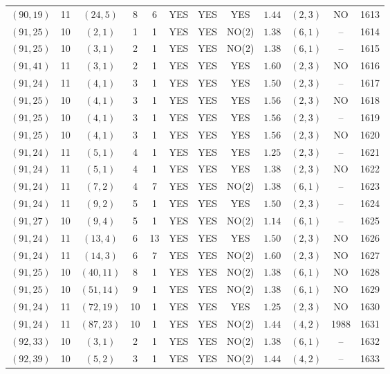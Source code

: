 \begin{longtable}{|c|c|c|c|c|c|c|c|c|c|c|c|}
$(90,19)$ & 11 & $(24,5)$ & 8 & 6 & YES & YES & YES & $1.44$ & $(2,3)$ & NO & 1613\\
$(91,25)$ & 10 & $(2,1)$ & 1 & 1 & YES & YES & NO(2) & $1.38$ & $(6,1)$ & -- & 1614\\
$(91,25)$ & 10 & $(3,1)$ & 2 & 1 & YES & YES & NO(2) & $1.38$ & $(6,1)$ & -- & 1615\\
$(91,41)$ & 11 & $(3,1)$ & 2 & 1 & YES & YES & YES & $1.60$ & $(2,3)$ & NO & 1616\\
$(91,24)$ & 11 & $(4,1)$ & 3 & 1 & YES & YES & YES & $1.50$ & $(2,3)$ & -- & 1617\\
$(91,25)$ & 10 & $(4,1)$ & 3 & 1 & YES & YES & YES & $1.56$ & $(2,3)$ & NO & 1618\\
$(91,25)$ & 10 & $(4,1)$ & 3 & 1 & YES & YES & YES & $1.56$ & $(2,3)$ & -- & 1619\\
$(91,25)$ & 10 & $(4,1)$ & 3 & 1 & YES & YES & YES & $1.56$ & $(2,3)$ & NO & 1620\\
$(91,24)$ & 11 & $(5,1)$ & 4 & 1 & YES & YES & YES & $1.25$ & $(2,3)$ & -- & 1621\\
$(91,24)$ & 11 & $(5,1)$ & 4 & 1 & YES & YES & YES & $1.38$ & $(2,3)$ & NO & 1622\\
$(91,24)$ & 11 & $(7,2)$ & 4 & 7 & YES & YES & NO(2) & $1.38$ & $(6,1)$ & -- & 1623\\
$(91,24)$ & 11 & $(9,2)$ & 5 & 1 & YES & YES & YES & $1.50$ & $(2,3)$ & -- & 1624\\
$(91,27)$ & 10 & $(9,4)$ & 5 & 1 & YES & YES & NO(2) & $1.14$ & $(6,1)$ & -- & 1625\\
$(91,24)$ & 11 & $(13,4)$ & 6 & 13 & YES & YES & YES & $1.50$ & $(2,3)$ & NO & 1626\\
$(91,24)$ & 11 & $(14,3)$ & 6 & 7 & YES & YES & NO(2) & $1.60$ & $(2,3)$ & NO & 1627\\
$(91,25)$ & 10 & $(40,11)$ & 8 & 1 & YES & YES & NO(2) & $1.38$ & $(6,1)$ & NO & 1628\\
$(91,25)$ & 10 & $(51,14)$ & 9 & 1 & YES & YES & NO(2) & $1.38$ & $(6,1)$ & NO & 1629\\
$(91,24)$ & 11 & $(72,19)$ & 10 & 1 & YES & YES & YES & $1.25$ & $(2,3)$ & NO & 1630\\
$(91,24)$ & 11 & $(87,23)$ & 10 & 1 & YES & YES & NO(2) & $1.44$ & $(4,2)$ & 1988 & 1631\\
$(92,33)$ & 10 & $(3,1)$ & 2 & 1 & YES & YES & NO(2) & $1.38$ & $(6,1)$ & -- & 1632\\
$(92,39)$ & 10 & $(5,2)$ & 3 & 1 & YES & YES & NO(2) & $1.44$ & $(4,2)$ & -- & 1633\\

\end{longtable}
